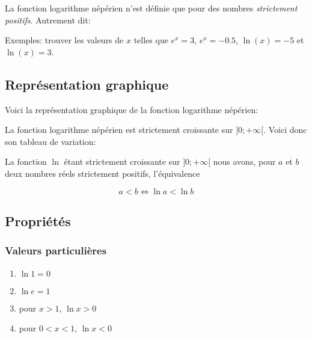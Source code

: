 \documentclass[a4paper,12pt]{scrartcl}
\begin{document}
La fonction logarithme népérien n'est définie que pour des nombres \emph{strictement positifs}. Autrement dit:

\Answer{$\mathcal{D}_{\ln} = ]0 ; +\infty[$}

Exemples: trouver les valeurs de $x$ telles que $e^x = 3$, $e^x = -0.5$, $\ln(x) = -5$ et $\ln(x) = 3$.


\subsection{Représentation graphique}

Voici la représentation graphique de la fonction logarithme népérien:

\begin{center}
\end{center}

La fonction logarithme népérien est strictement croissante sur $]0 ; +\infty[$. Voici donc son tableau de variation:

\begin{center} 
\end{center}

La fonction $\ln$ étant strictement croissante sur $]0 ; +\infty[$ nous avons, pour $a$ et $b$ deux nombres réels strictement positifs, l'équivalence

\begin{equation*}
 a < b \Leftrightarrow \ln a < \ln b
\end{equation*}


\subsection{Propriétés}

\subsubsection{Valeurs particulières}

\begin{enumerate}
 \item $\ln 1 = 0$
 \item $\ln e = 1$
 \item pour $x >1$, $\ln x > 0$
 \item pour $0 < x <1$, $\ln x < 0$
\end{enumerate}
\end{document}
